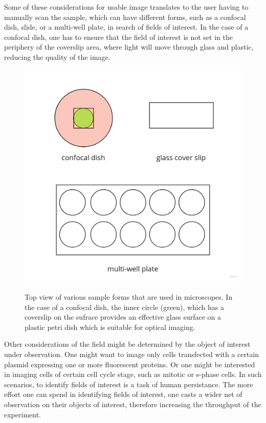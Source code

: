 Some of these considerations for usable image translates to the user having to manually scan the sample, which can have different forms, such as a confocal dish, slide, or a multi-well plate, in search of fields of interest. In the case of a confocal dish, one has to ensure that the field of interest is not set in the periphery of the coverslip area, where light will move through glass and plastic, reducing the quality of the image. 

\begin{figure}[H]
    {\hfill\includegraphics[width=1\linewidth]{figures/form.jpg}\hspace*{\fill}}
    \caption{Top view of various sample forms that are used in microscopes. In the case of a confocal dish, the inner circle (green), which has a coverslip on the sufrace provides an effective glass surface on a plastic petri dish which is suitable for optical imaging.}
    {\label{fig:form}}
\end{figure}

Other considerations of the field might be determined by the object of interest under observation. One might want to image only cells transfected with a certain plasmid expressing one or more fluorescent proteins. Or one might be interested in imaging cells of certain cell cycle stage, such as mitotic or s-phase cells. In such scenarios, to identify fields of interest is a task of human persistance. The more effort one can spend in identifying fields of interest, one casts a wider net of observation on their objects of interest, therefore increasing the throughput of the experiment.

